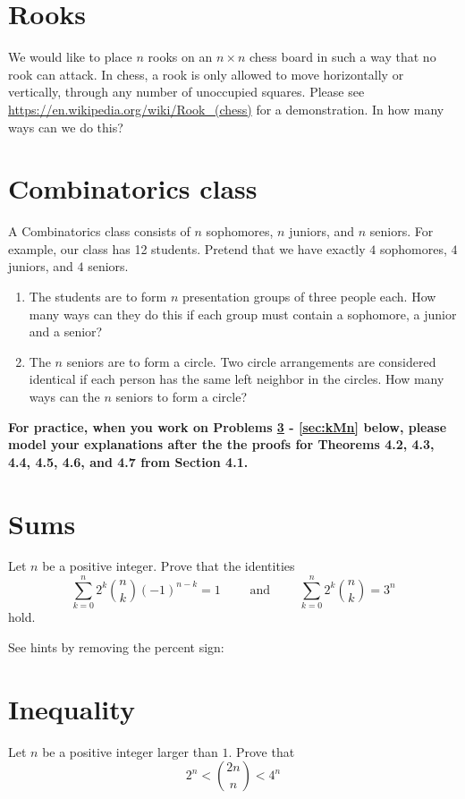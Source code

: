 \documentclass[12pt]{amsart}
\begin{document}
\section{Rooks}
We would like to place $n$ rooks on an $n\times n$ chess board in such a way that no rook can attack. 
In chess, a rook is only allowed to move horizontally or vertically, through any number of unoccupied squares. Please see \url{https://en.wikipedia.org/wiki/Rook_(chess)} for a demonstration. 
In how many ways can we do this? 



\section{Combinatorics class}\label{sec:combinatorics}
A Combinatorics class consists of $n$ sophomores, $n$ juniors, and $n$ seniors.  For example, our class has 12 students. Pretend that we have exactly $4$ sophomores, $4$ juniors, and $4$ seniors. 

\begin{enumerate}
\item The students are to form $n$ presentation groups of three people each. How many ways can they do this if each group must contain a sophomore, a junior and a senior?
\item The $n$ seniors are to form a circle. Two circle arrangements are considered identical if each person has the same left neighbor in the circles. How many ways can the $n$ seniors to form a circle? 
 \end{enumerate}

\bigskip

\noindent 
\textbf{
For practice, when you work on Problems \ref{sec:sums} - \ref{sec:kMn} below, please model your explanations after the the proofs for Theorems 4.2, 4.3, 4.4, 4.5, 4.6, and 4.7 from Section 4.1.}

\section{Sums}\label{sec:sums}
Let $n$ be a positive integer. Prove that the identities 
\[
\sum_{k=0}^n 2^k {n \choose k} (-1)^{n-k} = 1 \qquad \text{ and } \qquad
\sum_{k=0}^n 2^k {n \choose k} = 3^n
\]
hold. 

\noindent See hints by removing the percent sign:




\section{Inequality}
Let $n$ be a positive integer larger than $1$. Prove that 
\[
2^n < {2n \choose n} < 4^n
\]
\bigskip
\end{document}
